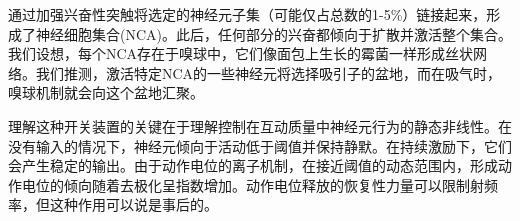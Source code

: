 \documentclass[a4paper,12pt]{article}
\begin{document}
通过加强兴奋性突触将选定的神经元子集（可能仅占总数的1-5\%）链接起来，形成了神经细胞集合(NCA)。此后，任何部分的兴奋都倾向于扩散并激活整个集合。我们设想，每个NCA存在于嗅球中，它们像面包上生长的霉菌一样形成丝状网络。我们推测，激活特定NCA的一些神经元将选择吸引子的盆地，而在吸气时，嗅球机制就会向这个盆地汇聚。

理解这种开关装置的关键在于理解控制在互动质量中神经元行为的静态非线性。在没有输入的情况下，神经元倾向于活动低于阈值并保持静默。在持续激励下，它们会产生稳定的输出。由于动作电位的离子机制，在接近阈值的动态范围内，形成动作电位的倾向随着去极化呈指数增加。动作电位释放的恢复性力量可以限制射频率，但这种作用可以说是事后的。


\newpage
{}
{}


\end{document}
